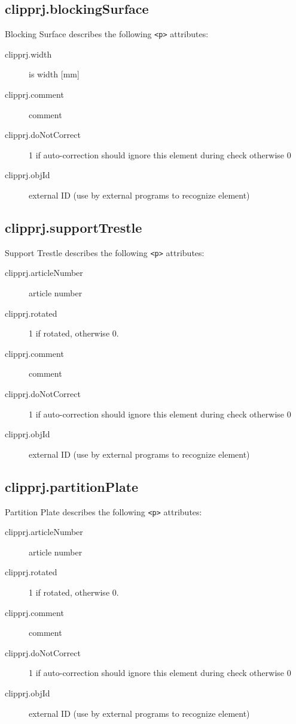 \documentclass[%
	a4paper,
	oneside,
	listof=numbered,
	parskip=half,
	headsepline=true,
	footsepline=true,
	]{scrbook}
\begin{document}
\subsection{clipprj.blockingSurface}
 
Blocking Surface describes the following \verb|<p>| attributes: 

\begin{description}
	\item[clipprj.width] is width [mm] 
	\item[clipprj.comment] comment 
	\item[clipprj.doNotCorrect] 1 if auto-correction should ignore this element during check otherwise 0 
	\item[clipprj.objId] external ID (use by external programs to recognize element) 
\end{description}

\subsection{clipprj.supportTrestle}
 
Support Trestle describes the following \verb|<p>| attributes: 

\begin{description}
	\item[clipprj.articleNumber] article number 
	\item[clipprj.rotated] 1 if rotated, otherwise 0. 
	\item[clipprj.comment] comment 
	\item[clipprj.doNotCorrect] 1 if auto-correction should ignore this element during check otherwise 0 
	\item[clipprj.objId] external ID (use by external programs to recognize element) 
\end{description}

\subsection{clipprj.partitionPlate}
 
Partition Plate describes the following \verb|<p>| attributes: 

\begin{description}
	\item[clipprj.articleNumber] article number 
	\item[clipprj.rotated] 1 if rotated, otherwise 0. 
	\item[clipprj.comment] comment 
	\item[clipprj.doNotCorrect] 1 if auto-correction should ignore this element during check otherwise 0 
	\item[clipprj.objId] external ID (use by external programs to recognize element) 
\end{description}
\end{document}
